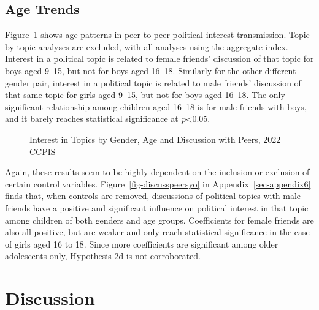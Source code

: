 \documentclass[
  letterpaper,
  DIV=11,
  numbers=noendperiod]{scrreprt}
\begin{document}
\subsection{Age Trends}\label{age-trends-1}

Figure~\ref{fig-discusspeersyoctrl} shows age patterns in peer-to-peer
political interest transmission. Topic-by-topic analyses are excluded,
with all analyses using the aggregate index. Interest in a political
topic is related to female friends' discussion of that topic for boys
aged 9--15, but not for boys aged 16--18. Similarly for the other
different-gender pair, interest in a political topic is related to male
friends' discussion of that same topic for girls aged 9--15, but not for
boys aged 16--18. The only significant relationship among children aged
16--18 is for male friends with boys, and it barely reaches statistical
significance at \emph{p}\textless0.05.

\begin{figure}


\caption{\label{fig-discusspeersyoctrl}Interest in Topics by Gender, Age
and Discussion with Peers, 2022 CCPIS}

\end{figure}%

Again, these results seem to be highly dependent on the inclusion or
exclusion of certain control variables. Figure~\ref{fig-discusspeersyo}
in Appendix~\ref{sec-appendix6} finds that, when controls are removed,
discussions of political topics with male friends have a positive and
significant influence on political interest in that topic among children
of both genders and age groups. Coefficients for female friends are also
all positive, but are weaker and only reach statistical significance in
the case of girls aged 16 to 18. Since more coefficients are significant
among older adolescents only, Hypothesis 2d is not corroborated.

\section{Discussion}\label{discussion-2}
\end{document}
